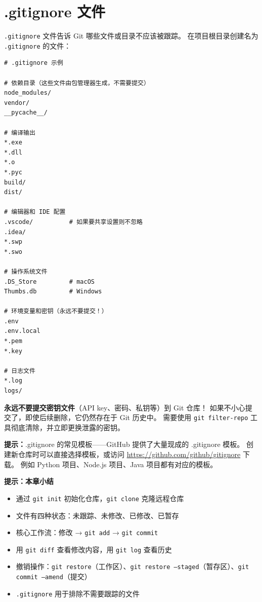 \documentclass[12pt,a4paper,openany]{ctexbook}
\begin{document}
\section{.gitignore 文件}

\texttt{.gitignore} 文件告诉 Git 哪些文件或目录不应该被跟踪。
在项目根目录创建名为 \texttt{.gitignore} 的文件：

\begin{lstlisting}[style=shell]
# .gitignore 示例

# 依赖目录（这些文件由包管理器生成，不需要提交）
node_modules/
vendor/
__pycache__/

# 编译输出
*.exe
*.dll
*.o
*.pyc
build/
dist/

# 编辑器和 IDE 配置
.vscode/          # 如果要共享设置则不忽略
.idea/
*.swp
*.swo

# 操作系统文件
.DS_Store         # macOS
Thumbs.db         # Windows

# 环境变量和密钥（永远不要提交！）
.env
.env.local
*.pem
*.key

# 日志文件
*.log
logs/
\end{lstlisting}

\begin{warnbox}
\textbf{永远不要提交密钥文件}（API key、密码、私钥等）到 Git 仓库！
如果不小心提交了，即使后续删除，它仍然存在于 Git 历史中。
需要使用 \texttt{git filter-repo} 工具彻底清除，并立即更换泄露的密钥。
\end{warnbox}

\medskip
\noindent\textbf{提示：}.gitignore 的常见模板——GitHub 提供了大量现成的 .gitignore 模板。
创建新仓库时可以直接选择模板，或访问 \url{https://github.com/github/gitignore} 下载。
例如 Python 项目、Node.js 项目、Java 项目都有对应的模板。
\medskip

\noindent\textbf{提示：}\textbf{本章小结}
\begin{itemize}
  \item 通过 \texttt{git init} 初始化仓库，\texttt{git clone} 克隆远程仓库
  \item 文件有四种状态：未跟踪、未修改、已修改、已暂存
  \item 核心工作流：修改 → \texttt{git add} → \texttt{git commit}
  \item 用 \texttt{git diff} 查看修改内容，用 \texttt{git log} 查看历史
  \item 撤销操作：\texttt{git restore}（工作区）、\texttt{git restore --staged}（暂存区）、\texttt{git commit --amend}（提交）
  \item \texttt{.gitignore} 用于排除不需要跟踪的文件
\end{itemize}
\medskip
\end{document}
